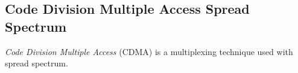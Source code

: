     
    



\subsection{Code Division Multiple Access Spread Spectrum}
\textit{Code Division Multiple Access} (CDMA) is a multiplexing technique used with spread spectrum.

